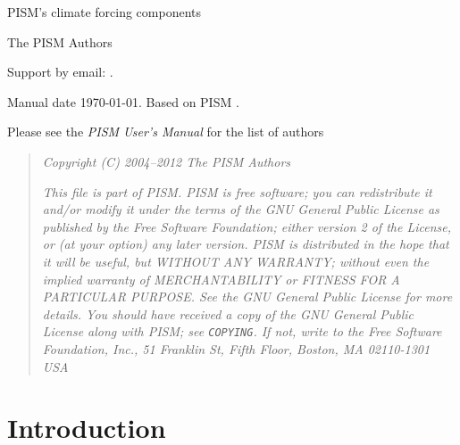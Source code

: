 \documentclass[titlepage,letterpaper,final]{scrartcl}
\begin{document}
\begin{titlepage}

  \begin{center}
    \vspace*{3.5cm}
    {\huge{} PISM's climate forcing components}
    \vspace{0.5cm}

    {\Large The PISM Authors}
    \vspace{1cm}

    \vfill

    \small Support by email: \PISMEMAIL.
    \medskip

    Manual date \today. Based on PISM \PISMREV.
    \medskip

    \PISMDOWNLOADMSG
  \end{center}
\end{titlepage}

\newpage
\phantom{bob}

\begin{center}
  Please see the \emph{PISM User's Manual} for the list of authors
\end{center}

\vspace{0.2in}
\begin{quote}
  \textsl{Copyright (C) 2004--2012 The PISM Authors}
  \medskip

  \noindent \textsl{This file is part of PISM.  PISM is free software; you can redistribute it and/or modify it under the terms of the GNU General Public License as published by the Free Software Foundation; either version 2 of the License, or (at your option) any later version.  PISM is distributed in the hope that it will be useful, but WITHOUT ANY WARRANTY; without even the implied warranty of MERCHANTABILITY or FITNESS FOR A PARTICULAR PURPOSE.  See the GNU General Public License for more details.  You should have received a copy of the GNU General Public License along with PISM; see \emph{\texttt{COPYING}}.  If not, write to the Free Software Foundation, Inc., 51 Franklin St, Fifth Floor, Boston, MA  02110-1301 USA}
\end{quote}

\newpage
\setcounter{tocdepth}{3}
\small
\tableofcontents
\normalsize

\newpage


\section{Introduction}
\label{sect:intro}
\end{document}
